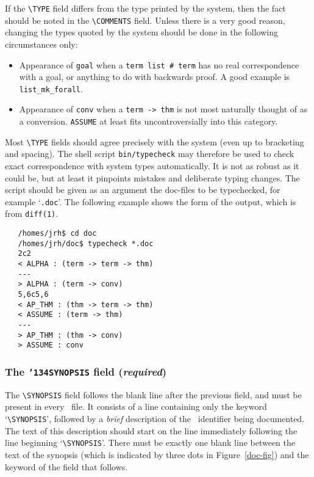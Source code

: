 If the {\small\verb!\TYPE!} field differs from the type printed by the system,
then the fact should be noted in the {\small\verb!\COMMENTS!} field.  Unless
there is a very good reason, changing the types quoted by the system should be
done in the following circumstances only:

\begin{itemize}
  \item Appearance of {\small\verb!goal!} when a
        {\small\verb!term list # term!} has no real
        correspondence with a goal, or anything to do with backwards
        proof. A good example is {\small\verb!list_mk_forall!}.
  \item Appearance of {\small\verb!conv!} when a {\small\verb!term -> thm!} is
        not most
        naturally thought of as a conversion. {\small\verb!ASSUME!} at
        least fits uncontroversially into this category.
\end{itemize}

Most {\small\verb!\TYPE!} fields should agree precisely with the system
(even up to bracketing and spacing). The shell script
{\small\verb!bin/typecheck!} may therefore be used
to check exact correspondence with system types automatically. It is not as
robust as it could be, but at least it pinpoints mistakes and deliberate typing
changes.  The script should be given as an argument the doc-files to be
typechecked, for example `{\tt *.doc}'. The following example shows the form of
the output, which is from {\tt diff(1)}.

{\small \begin{verbatim}
   /homes/jrh$ cd doc
   /homes/jrh/doc$ typecheck *.doc
   2c2
   < ALPHA : (term -> term -> thm)
   ---
   > ALPHA : (term -> conv)
   5,6c5,6
   < AP_THM : (thm -> term -> thm)
   < ASSUME : (term -> thm)
   ---
   > AP_THM : (thm -> conv)
   > ASSUME : conv
\end{verbatim}}

\subsubsection{The {\tt {\char'134}SYNOPSIS} field ({\it required})}

The {\small\verb!\SYNOPSIS!} field follows the blank line after the
previous field, and must be present in every \doc\ file.  It
consists of a line containing only the keyword `{\small\verb!\SYNOPSIS!}',
followed by a {\it brief\/} description of the \ML\ identifier being
documented. The text of this description should start on the line immediately
following the line beginning `{\small\verb!\SYNOPSIS!}'.  There must be
exactly one blank line between the text of the synopsis (which is indicated by
three dots in Figure~\ref{doc-fig}) and the keyword of the field that
follows.

